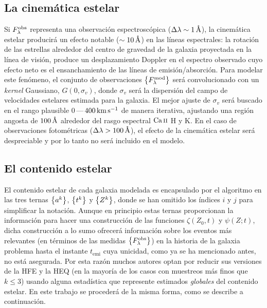 \subsection{La cinemática estelar}

Si $\sedt[F]{obs}$ representa una observación espectroscópica ($\Delta\lambda\sim\unit[1]{\AA}$), la
cinemática estelar producirá un efecto notable ($\sim\unit[10]{\AA}$) en las líneas espectrales: la
rotación de las estrellas alrededor del centro de gravedad de la galaxia proyectada en la línea de
visión, produce un desplazamiento Doppler en el espectro observado cuyo efecto neto es el
ensanchamiento de las líneas de emisión/absorción. Para modelar este fenómeno, el conjunto de
observaciones $\set{\sedt[F]{mod}}$ será convolucionado con un \emph{kernel} Gaussiano,
$G(0,\sigma_v)$, donde $\sigma_v$ será la dispersión del campo de velocidades estelares estimada
para la galaxia. El mejor ajuste de $\sigma_v$ será buscado en el rango plausible
$0\,$---$\,\unit[400]{km\,s\up{-1}}$ de manera iterativa, ajustando una región angosta de
$\unit[100]{\AA}$ alrededor del rasgo espectral $\Caii$ H y K. En el caso de observaciones
fotométricas ($\Delta\lambda>\unit[100]{\AA}$), el efecto de la cinemática estelar será despreciable
y por lo tanto no será incluido en el modelo.

\subsection{El contenido estelar}

El contenido estelar de cada galaxia modelada es encapsulado por el algoritmo \dynbas en las tres
ternas $\set{a^k}$, $\set{t^k}$ y $\set{Z^k}$, donde se han omitido los índices $i$ y $j$ para
simplificar la notación. Aunque en principio estas ternas proporcionan la información para hacer una
construcción de las funciones $\zeta(Z_0,t)$ y $\psi(Z;t)$, dicha construcción a lo sumo ofrecerá
información sobre los eventos más relevantes (en términos de las medidas $\set{\sedt[F]{obs}}$) en
la historia de la galaxia problema hasta el instante $t_\text{emi}$ cuya unicidad, como ya se ha
mencionado antes, no está asegurada. Por esta razón muchos autores \citep[\eg,][]{Heavens2000,
Brinchmann2004, Gallazzi2005, Lee2009, CidFernandes2013, Magris2015} optan por reducir sus versiones
de la HFE y la HEQ (en la mayoría de los casos con muestreos más finos que $k\leq3$) usando alguna
estadística que represente estimados \emph{globales} del contenido estelar. En este trabajo se
procederá de la misma forma, como se describe a continuación.

